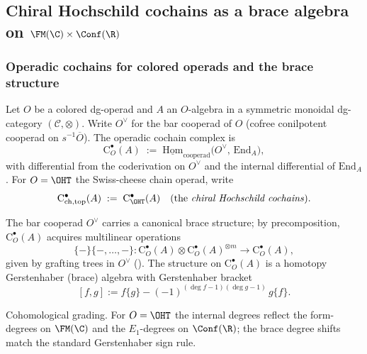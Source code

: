 \subsection{\texorpdfstring{Chiral Hochschild cochains as a brace algebra on $\FM(\C)\times\Conf(\R)$}{Chiral Hochschild cochains as a brace algebra on FM(C) x Conf(R)}}
\label{sec:chiral-Hochschild}

\subsubsection{Operadic cochains for colored operads and the brace structure}
\label{subsec:operadic-cochains}
Let $O$ be a colored dg-operad and $A$ an $O$-algebra in a symmetric monoidal dg-category $(\mathcal C,\otimes)$.
Write $O^\vee$ for the bar cooperad of $O$ (cofree conilpotent cooperad on $s^{-1}\overline O$).
The operadic cochain complex is
\[
\mathrm{C}^\bullet_O(A) \;:=\; \underline{\mathrm{Hom}}_{\text{cooperad}} \bigl( O^\vee,\, \mathrm{End}_A \bigr),
\]
with differential from the coderivation on $O^\vee$ and the internal differential of $\mathrm{End}_A$.
For $O = \OHT$ the Swiss-cheese chain operad, write
\[
\mathrm{C}^\bullet_{\mathrm{ch,top}}(A)\;:=\;\mathrm{C}^\bullet_{\OHT}(A)
\quad\text{(the \emph{chiral Hochschild cochains})}.
\]

\begin{definition}
\label{def:brace-ops}
The bar cooperad $O^\vee$ carries a canonical brace structure; by precomposition,
$\mathrm{C}^\bullet_O(A)$ acquires multilinear operations
\[
\{-\}\{-,\ldots,-\}\colon \mathrm{C}^\bullet_O(A)\otimes \mathrm{C}^\bullet_O(A)^{\otimes m}\longrightarrow \mathrm{C}^\bullet_O(A),
\]
given by grafting trees in $O^\vee$ (\cite{GJ94,Vor99}).
The structure on $\mathrm{C}^\bullet_O(A)$ is a homotopy Gerstenhaber (brace) algebra with Gerstenhaber bracket
\[
[f,g] := f\{g\} - (-1)^{(\deg f-1)(\deg g-1)}\, g\{f\}.
\]
\end{definition}

\begin{remark}
Cohomological grading. For $O=\OHT$ the internal degrees reflect the form-degrees on $\FM(\C)$ and the $E_1$-degrees on $\Conf(\R)$; the brace degree shifts match the standard Gerstenhaber sign rule.
\end{remark}

